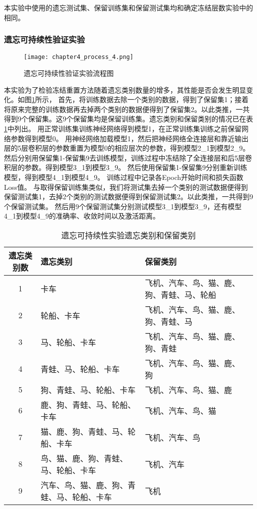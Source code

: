 本实验中使用的遗忘测试集、保留训练集和保留测试集均和确定冻结层数实验中的相同。

\subsubsection{遗忘可持续性验证实验}
\begin{figure}
    \centering
    \texttt{[image: chapter4\_process\_4.png]}
    \caption{遗忘可持续性验证实验流程图}
    \label{fig:chapter4_process_4}
\end{figure}

本实验为了检验冻结重置方法随着遗忘类别数量的增多，其性能是否会发生明显变化。如图\ref{fig:chapter4_process_4}所示，
首先，将训练数据去除一个类别的数据，得到了保留集1；接着将原来完整的训练数据再去掉两个类别的数据便得到了保留集2。以此类推，一共得到9个保留集。这9个保留集均是保留训练集。遗忘类别和保留类别的情况已在表\ref{tab:forget-continuous-kinds}中列出。
用正常训练集训练神经网络得到模型1，在正常训练集训练之前保留网络参数得到模型0。
用神经网络加载模型1，然后把神经网络全连接层和靠近输出层的5层卷积层的参数重置为模型0的相应层次的参数，得到模型2\_1到模型2\_9。
然后分别用保留集1-保留集9去训练模型，训练过程中冻结除了全连接层和后5层卷积层的参数。得到模型3\_1到模型3\_9。
然后使用保留集1-保留集9分别重新训练模型，得到模型4\_1到模型4\_9。
训练过程中记录各Epoch开始时间和损失函数Loss值。
与取得保留训练集类似，我们将测试集去掉一个类别的测试数据便得到保留测试集1，去掉2个类别的测试数据便得到保留测试集2。以此类推，一共得到9个保留测试集。
然后用9个保留测试集分别测试模型3\_1到模型3\_9，还有模型4\_1到模型4\_9的准确率、收敛时间以及激活距离。

\begin{table}
    \centering
    \caption{遗忘可持续性实验遗忘类别和保留类别}
    \begin{tabular}{cp{3cm}p{3cm}p{3cm}}
      \toprule
      遗忘类别数  & 遗忘类别 & 保留类别  \\
      \midrule
      1 & 卡车  & 飞机、汽车、鸟、猫、鹿、狗、青蛙、马、轮船  \\
      2 & 轮船、卡车  & 飞机、汽车、鸟、猫、鹿、狗、青蛙、马  \\
      3 & 马、轮船、卡车  & 飞机、汽车、鸟、猫、鹿、狗、青蛙  \\
      4 & 青蛙、马、轮船、卡车  & 飞机、汽车、鸟、猫、鹿、狗  \\
      5 & 狗、青蛙、马、轮船、卡车  & 飞机、汽车、鸟、猫、鹿  \\
      6 & 鹿、狗、青蛙、马、轮船、卡车  & 飞机、汽车、鸟、猫  \\
      7 & 猫、鹿、狗、青蛙、马、轮船、卡车  & 飞机、汽车、鸟  \\
      8 & 鸟、猫、鹿、狗、青蛙、马、轮船、卡车  & 飞机、汽车  \\
      9 & 汽车、鸟、猫、鹿、狗、青蛙、马、轮船、卡车  & 飞机  \\
      \bottomrule
    \end{tabular}
    \label{tab:forget-continuous-kinds}
\end{table}

